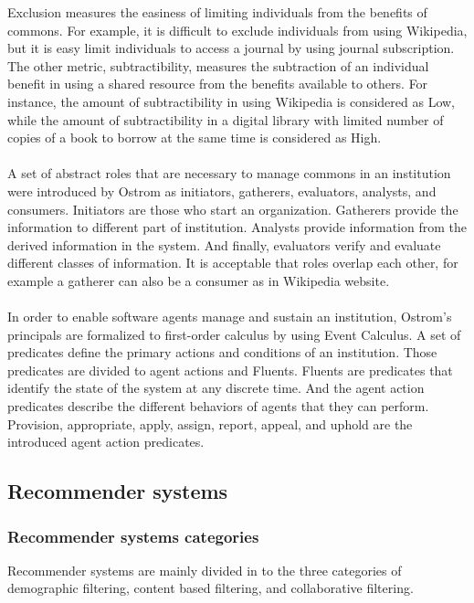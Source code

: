\documentclass [12pt]{article} \usepackage{multicol}
\begin{document}
 Exclusion measures the easiness of limiting individuals from the benefits of commons. For example, it
is difficult to exclude individuals from using Wikipedia, but
it is easy limit individuals to access a journal by using journal
subscription. The other metric, subtractibility, measures the
subtraction of an individual benefit in using a shared resource from
the benefits available to others. For instance, the amount of
subtractibility in using Wikipedia is considered as Low, while the
amount of subtractibility in  a digital library with limited number of copies of a book to borrow at
the same time is considered as High. \paragraph{} A set of abstract roles that are necessary to manage commons in an
institution were introduced by Ostrom as initiators, gatherers, evaluators, analysts,
and consumers. Initiators are those who start an organization.
Gatherers provide the information to different part of institution.
Analysts provide information from the derived information in the
system. And finally, evaluators verify and evaluate different
classes of information. It is acceptable that roles overlap each
other, for example a gatherer can also be a consumer as in Wikipedia
website. \paragraph{} In order to enable software agents manage and
sustain an institution, Ostrom’s principals are formalized
to first-order calculus by using Event Calculus. A set of predicates define the primary actions and
conditions of an institution. Those predicates are divided to agent actions and
Fluents. Fluents are predicates that identify the state of the
system at any discrete time. And the agent action predicates describe the
different behaviors of agents that they can perform. Provision,
appropriate, apply, assign, report, appeal, and uphold are the introduced agent action predicates. ~\cite{macbeth2015self} 


\subsection{Recommender systems}

\subsubsection{Recommender systems categories}
	Recommender systems are mainly divided in to the three
categories of demographic filtering, content based filtering, and
collaborative filtering. ~\cite{bobadilla2013recommender}
\end{document}
